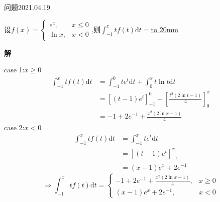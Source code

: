\begin{mybox}{问题2021.04.19}
	
	\qquad 设$f(x)=\begin{cases}
		e^x,&x\le 0\\
		\ln x,&x<0
	\end{cases} $,则$\int_{-1}^{x}tf(t)\mathrm{d}t=$\underline{\hbox to 20mm{}}
\end{mybox}
\noindent
\textbf{解}

\noindent
case 1:$x\ge 0$
\begin{align*}
	\int_{-1}^{x}tf(t)\mathrm{d}t&=\int_{-1}^{0}te^t\mathrm{d}t+\int_{0}^{x}t\ln t\mathrm{d}t\\
	&=[(t-1)e^t]_{-1}^{0} + [\frac{t^2(2\ln t-1)}{4}]_{0}^{x}\\
	&=-1+2e^{-1}+\frac{x^2(2\ln x -1)}{4}
\end{align*}
case 2:$x <0$
\begin{align*}
	\int_{-1}^{x}tf(t)\mathrm{d}t&=\int_{-1}^{x}te^t\mathrm{d}t\\
	&=[(t-1)e^t]_{-1}^{x}\\
	&=(x-1)e^x+2e^{-1}
\end{align*}
$$\Rightarrow \int_{-1}^{x}tf(t)\mathrm{d}t=\begin{cases}
	-1+2e^{-1}+\frac{x^2(2\ln x -1)}{4},& x\ge 0\\
	(x-1)e^x+2e^{-1},& x<0
\end{cases}$$